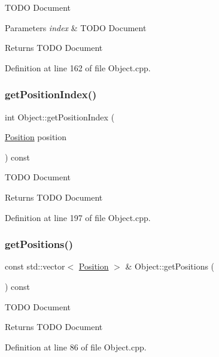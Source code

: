 T\+O\+DO Document 
\begin{DoxyParams}{Parameters}
{\em index} & T\+O\+DO Document \\
\hline
\end{DoxyParams}
\begin{DoxyReturn}{Returns}
T\+O\+DO Document 
\end{DoxyReturn}


Definition at line 162 of file Object.\+cpp.

\mbox{\label{class_object_acc363689a681f08be8492107ab6ab2f4}} 
\subsubsection{\texorpdfstring{get\+Position\+Index()}{getPositionIndex()}}
{\footnotesize\ttfamily int Object\+::get\+Position\+Index (\begin{DoxyParamCaption}\item[{\hyperlink{struct_position}{Position}}]{position }\end{DoxyParamCaption}) const}

T\+O\+DO Document \begin{DoxyReturn}{Returns}
T\+O\+DO Document 
\end{DoxyReturn}


Definition at line 197 of file Object.\+cpp.

\mbox{\label{class_object_a7dde4f00d9004f52ddcd12077dbd71b8}} 
\subsubsection{\texorpdfstring{get\+Positions()}{getPositions()}}
{\footnotesize\ttfamily const std\+::vector$<$ \hyperlink{struct_position}{Position} $>$ \& Object\+::get\+Positions (\begin{DoxyParamCaption}{ }\end{DoxyParamCaption}) const}

T\+O\+DO Document \begin{DoxyReturn}{Returns}
T\+O\+DO Document 
\end{DoxyReturn}


Definition at line 86 of file Object.\+cpp.

